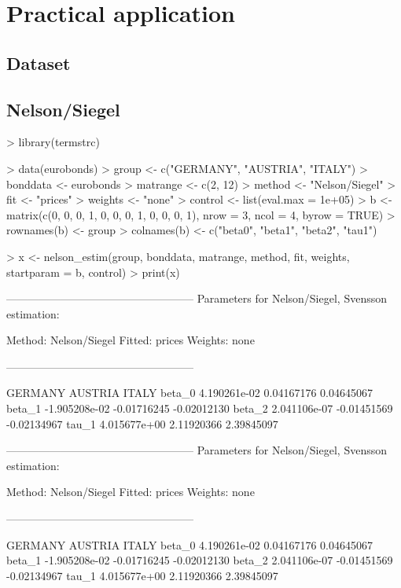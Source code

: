 \newpage
\section{Practical application}
\label{sec:pract-appl}

\subsection{Dataset}




\subsection{Nelson/Siegel}
\small
\begin{Schunk}
\begin{Sinput}
> library(termstrc)
\end{Sinput}
\end{Schunk}

\begin{Schunk}
\begin{Sinput}
> data(eurobonds)
> group <- c("GERMANY", "AUSTRIA", "ITALY")
> bonddata <- eurobonds
> matrange <- c(2, 12)
> method <- "Nelson/Siegel"
> fit <- "prices"
> weights <- "none"
> control <- list(eval.max = 1e+05)
> b <- matrix(c(0, 0, 0, 1, 0, 0, 0, 1, 0, 0, 0, 1), nrow = 3, ncol = 4, byrow = TRUE)
> rownames(b) <- group
> colnames(b) <- c("beta0", "beta1", "beta2", "tau1")
\end{Sinput}
\end{Schunk}

\begin{Schunk}
\begin{Sinput}
> x <- nelson_estim(group, bonddata, matrange, method, fit, weights, startparam = b, control)
> print(x)
\end{Sinput}
\begin{Soutput}
---------------------------------------------------
Parameters for Nelson/Siegel, Svensson estimation:

Method: Nelson/Siegel 
Fitted: prices 
Weights: none 

---------------------------------------------------

             GERMANY     AUSTRIA       ITALY
beta_0  4.190261e-02  0.04167176  0.04645067
beta_1 -1.905208e-02 -0.01716245 -0.02012130
beta_2  2.041106e-07 -0.01451569 -0.02134967
tau_1   4.015677e+00  2.11920366  2.39845097

---------------------------------------------------
Parameters for Nelson/Siegel, Svensson estimation:

Method: Nelson/Siegel 
Fitted: prices 
Weights: none 

---------------------------------------------------

             GERMANY     AUSTRIA       ITALY
beta_0  4.190261e-02  0.04167176  0.04645067
beta_1 -1.905208e-02 -0.01716245 -0.02012130
beta_2  2.041106e-07 -0.01451569 -0.02134967
tau_1   4.015677e+00  2.11920366  2.39845097
\end{Soutput}
\end{Schunk}

